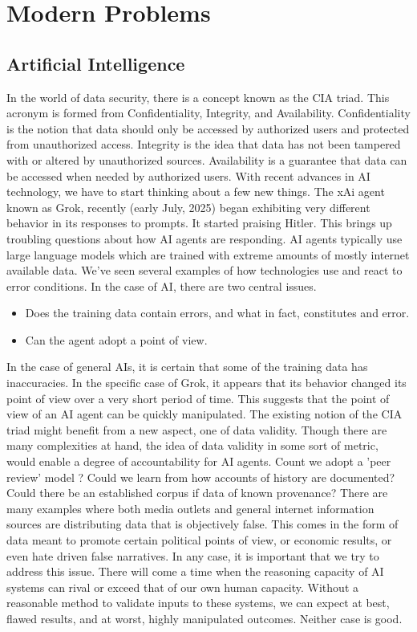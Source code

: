 \documentclass[
	a4paper, %
	10pt, %
	unnumberedsections, %
	twoside, %
]{LTJournalArticle}
\begin{document}

\section{Modern Problems} 

\subsection{Artificial Intelligence} 
In the world of data security, there is a concept known as the CIA triad. This acronym is formed from 
Confidentiality, Integrity, and Availability. Confidentiality is the notion that data should only be accessed by 
authorized users and protected from unauthorized access. Integrity is the idea that data has not been tampered with or 
altered by unauthorized sources. Availability is a guarantee that data can be accessed when needed by authorized users. 
With recent advances in AI technology, we have to start thinking about a few new things.  
The xAi agent known as Grok, recently (early July, 2025) began exhibiting very different behavior in its responses to 
prompts. It started praising Hitler. This brings up troubling questions about how AI agents are responding. AI agents
typically use large language models which are trained with extreme amounts of mostly internet available data. 
We've seen several examples of how technologies use and react to error conditions. In the case of AI, there are 
two central issues.
\begin{itemize}
\item Does the training data contain errors, and what in fact, constitutes and error.
\item Can the agent adopt a point of view.
\end{itemize}
In the case of general AIs, it is certain that some of the training data has inaccuracies. In the specific case of 
Grok, it appears that its behavior changed its point of view over a very short period of time. This suggests that 
the point of view of an AI agent can be quickly manipulated. The existing notion of the CIA triad might benefit from
a new aspect, one of data validity. Though there are many complexities at hand, the idea of data validity in some
sort of metric, would enable a degree of accountability for AI agents. 
Count we adopt a 'peer review' model ? Could we learn from how accounts of history are documented? Could there
be an established corpus if data of known provenance? 
There are many examples where both media outlets and general internet information sources are distributing data that
is objectively false. This comes in the form of data meant to promote certain political points of view, or 
economic results, or even hate driven false narratives. In any case, it is important that we try to address this 
issue. There will come a time when the reasoning capacity of AI systems can rival or exceed that of our own human
capacity. Without a reasonable method to validate inputs to these systems, we can expect at best, flawed results, and
at worst, highly manipulated outcomes. Neither case is good. 
 
\end{document}
